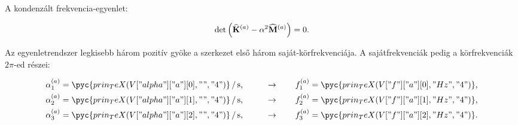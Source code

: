 A kondenzált frekvencia-egyenlet:
\begin{myframe}
  \begin{equation}
    \det \left(
    \widehat{\mathbf{K}}^{(a)} - \alpha^2 \widehat{\mathbf{M}}^{(a)}
    \right) = 0
    \text.
  \end{equation}
\end{myframe}

Az egyenletrendszer legkisebb három pozitív gyöke a szerkezet első három
saját-körfrekvenciája. A sajátfrekvenciák pedig a körfrekvenciák $2\pi$-ed
részei:
\begin{myframe}
  \begin{alignat}{9}
    \alpha_1^\a & = \pyc{prin_TeX(V["alpha"]["a"][0], "", "4")} \,/\, \mathrm{s} \text,
    \qquad      & \rightarrow \qquad
    f_1^\a      & = \pyc{prin_TeX(V["f"]["a"][0], "Hz", "4")}
    \text,                                                                              \\
    \alpha_2^\a & = \pyc{prin_TeX(V["alpha"]["a"][1], "", "4")} \,/\, \mathrm{s} \text,
    \qquad      & \rightarrow \qquad
    f_2^\a      & = \pyc{prin_TeX(V["f"]["a"][1], "Hz", "4")}
    \text,                                                                              \\
    \alpha_3^\a & = \pyc{prin_TeX(V["alpha"]["a"][2], "", "4")} \,/\, \mathrm{s} \text,
    \qquad      & \rightarrow \qquad
    f_3^\a      & = \pyc{prin_TeX(V["f"]["a"][2], "Hz", "4")}
    \text.
  \end{alignat}
\end{myframe}
